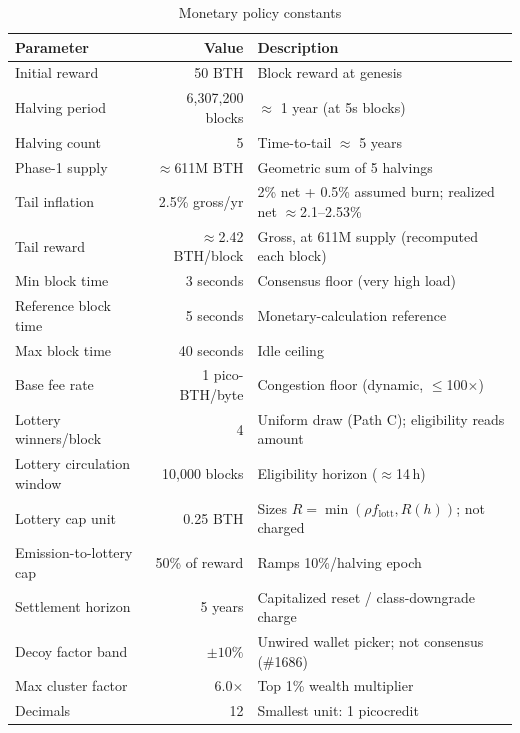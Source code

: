 \begin{table}[h]
\centering
\caption{Monetary policy constants}
\label{tab:constants}
\begin{tabular}{@{}lrl@{}}
\toprule
\textbf{Parameter} & \textbf{Value} & \textbf{Description} \\
\midrule
Initial reward & 50 BTH & Block reward at genesis \\
Halving period & 6,307,200 blocks & $\approx$ 1 year (at 5s blocks) \\
Halving count & 5 & Time-to-tail $\approx$ 5 years \\
Phase-1 supply & $\approx$611M BTH & Geometric sum of 5 halvings \\
Tail inflation & 2.5\% gross/yr & 2\% net + 0.5\% assumed burn; realized net $\approx$2.1--2.53\% \\
Tail reward & $\approx$2.42 BTH/block & Gross, at 611M supply (recomputed each block) \\
Min block time & 3 seconds & Consensus floor (very high load) \\
Reference block time & 5 seconds & Monetary-calculation reference \\
Max block time & 40 seconds & Idle ceiling \\
Base fee rate & 1 pico-BTH/byte & Congestion floor (dynamic, $\leq$100$\times$) \\
Lottery winners/block & 4 & Uniform draw (Path C); eligibility reads amount \\
Lottery circulation window & 10,000 blocks & Eligibility horizon ($\approx$14\,h) \\
Lottery cap unit & 0.25 BTH & Sizes $R = \min(\rho f_{\text{lott}}, R(h))$; not charged \\
Emission-to-lottery cap & 50\% of reward & Ramps 10\%/halving epoch \\
Settlement horizon & 5 years & Capitalized reset / class-downgrade charge \\
Decoy factor band & $\pm 10\%$ & Unwired wallet picker; not consensus (\#1686) \\
Max cluster factor & 6.0$\times$ & Top 1\% wealth multiplier \\
Decimals & 12 & Smallest unit: 1 picocredit \\
\bottomrule
\end{tabular}
\end{table}


